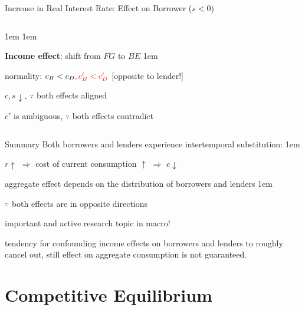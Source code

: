 \documentclass[11pt,aspectratio=43,usenames,dvipsnames]{beamer}
\newcommand{\red}[1]{\textcolor{red}{#1}}
\let\olditemize=\itemize
\let\endolditemize=\enditemize
\renewenvironment{itemize}{\olditemize \itemsep1em}{\endolditemize}
\theoremstyle{definition}
\begin{document}
\begin{frame}{Increase in Real Interest Rate: Effect on Borrower ($s < 0$)}
\begin{columns}
\begin{column}{0.5\textwidth}
\begin{itemize}
\begin{itemize}
                \end{itemize}
                \item \textbf{Income effect}: shift from $ \overline{FG} $ to $ \overline{BE} $
                \begin{itemize}
                    \item normality: $ c_{B} < c_{D}, \red{c'_{B} < c'_{D}} $ [opposite to lender!]
                    \item $ c, s \downarrow $, $ \because $ both effects aligned
                    \item $ c' $ is ambiguous, $ \because $ both effects contradict
                \end{itemize}
            \end{itemize}
        \end{column}
    \end{columns}
\end{frame}

\begin{frame}{Summary}
\label{slide:Summary}
    Both borrowers and lenders experience \alert{intertemporal substitution}:
    \begin{itemize}
        \item $ r \uparrow  $ $ \Rightarrow  $ cost of current consumption $ \uparrow  $ $ \Rightarrow  $ $ c \downarrow  $
        \item aggregate effect depends on the \alert{distribution} of borrowers and lenders
        \begin{itemize}
            \item $ \because $ both effects are in opposite directions
            \item important and active research topic in macro!
        \end{itemize}
        \item tendency for confounding income effects on borrowers and lenders to roughly cancel out, still \alert{effect on aggregate consumption} is not guaranteed.
    \end{itemize}
\end{frame}

\section{Competitive Equilibrium}
\label{sec:Competitive_Equilibrium}
\end{document}
